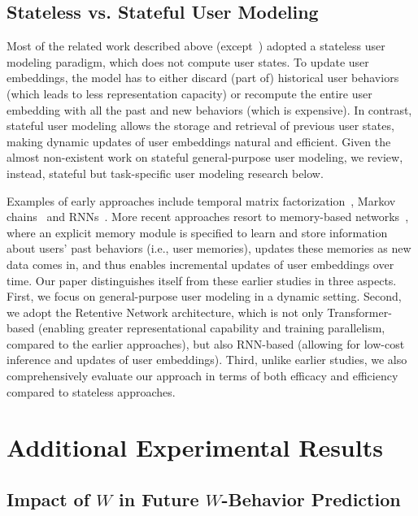 \documentclass{article}
\begin{document}


\subsection{Stateless vs. Stateful User Modeling}
Most of the related work described above (except~\citep{chen_predictive_2018}) adopted a stateless user modeling paradigm, which does not compute user states. To update user embeddings, the model has to either discard (part of) historical user behaviors (which leads to less representation capacity) or recompute the entire user embedding with all the past and new behaviors (which is expensive). In contrast, stateful user modeling allows the storage and retrieval of previous user states, making dynamic updates of user embeddings natural and efficient. 
Given the almost non-existent work on stateful general-purpose user modeling, we review, instead, stateful but task-specific user modeling research below.

Examples of early approaches include temporal matrix factorization~\citep{koren2009collaborative}, Markov chains~\citep{he2016vista,he2016fusing,rendle2010factorizing} and RNNs~\citep{beutel2018latent,hidasi2018recurrent,liu2016context}. More recent approaches resort to memory-based networks~\citep{ren2019lifelong,pi2019practice}, where an explicit memory module is specified to learn and store information about users' past behaviors (i.e., user memories), updates these memories as new data comes in, and thus enables incremental updates of user embeddings over time. 
Our paper distinguishes itself from these earlier studies in three aspects.
First, we focus on general-purpose user modeling in a dynamic setting. 
Second, we adopt the Retentive Network architecture, which is not only Transformer-based (enabling greater representational capability and training parallelism, compared to the earlier approaches), but also RNN-based (allowing for low-cost inference and updates of user embeddings). 
Third, unlike earlier studies, we also comprehensively evaluate our approach in terms of both efficacy and efficiency compared to stateless approaches.


\section{Additional Experimental Results}



\subsection{Impact of $W$ in Future $W$-Behavior Prediction }
\label{subsec:experiments_ablation}
\end{document}
